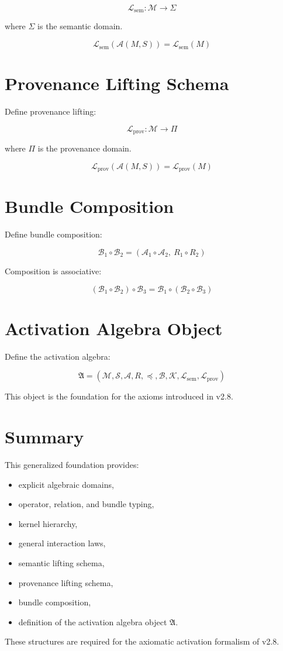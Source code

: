 \documentclass[11pt]{article}
\begin{document}
\[
\mathcal{L}_{\text{sem}} : \mathcal{M} \to \Sigma
\]

where $\Sigma$ is the semantic domain.

\[
\mathcal{L}_{\text{sem}}(\mathcal{A}(M, S)) = \mathcal{L}_{\text{sem}}(M)
\]

\section*{Provenance Lifting Schema}

Define provenance lifting:

\[
\mathcal{L}_{\text{prov}} : \mathcal{M} \to \Pi
\]

where $\Pi$ is the provenance domain.

\[
\mathcal{L}_{\text{prov}}(\mathcal{A}(M, S)) = \mathcal{L}_{\text{prov}}(M)
\]

\section*{Bundle Composition}

Define bundle composition:

\[
\mathcal{B}_1 \circ \mathcal{B}_2 =
(\mathcal{A}_1 \circ \mathcal{A}_2,\ R_1 \circ R_2)
\]

Composition is associative:

\[
(\mathcal{B}_1 \circ \mathcal{B}_2) \circ \mathcal{B}_3
=
\mathcal{B}_1 \circ (\mathcal{B}_2 \circ \mathcal{B}_3)
\]

\section*{Activation Algebra Object}

Define the activation algebra:

\[
\mathfrak{A} =
(\mathcal{M}, \mathcal{S}, \mathcal{A}, R, \preceq, \mathcal{B}, \mathcal{K},
 \mathcal{L}_{\text{sem}}, \mathcal{L}_{\text{prov}})
\]

This object is the foundation for the axioms introduced in v2.8.

\section*{Summary}

This generalized foundation provides:

\begin{itemize}
\item explicit algebraic domains,
\item operator, relation, and bundle typing,
\item kernel hierarchy,
\item general interaction laws,
\item semantic lifting schema,
\item provenance lifting schema,
\item bundle composition,
\item definition of the activation algebra object $\mathfrak{A}$.
\end{itemize}

These structures are required for the axiomatic activation formalism of v2.8.
\end{document}
